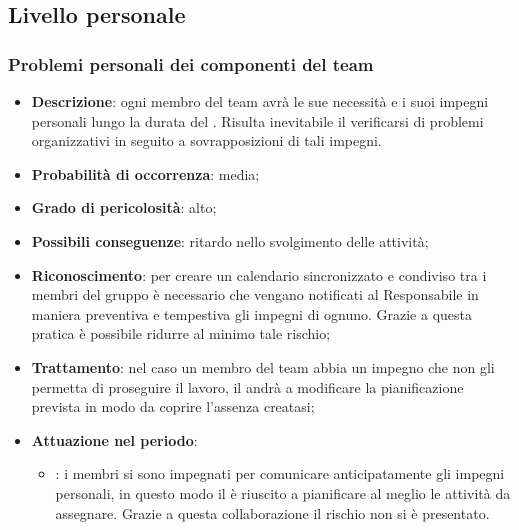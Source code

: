 \documentclass[PianoDiProgetto.tex]{subfiles}
\begin{document}
	\subsection{Livello personale}
		\subsubsection{Problemi personali dei componenti del team}
			\label{sec:ppdct}
\begin{itemize}
		\item \textbf{Descrizione}: ogni membro del team avrà le sue necessità e i suoi impegni personali lungo la durata del . Risulta inevitabile il verificarsi di problemi organizzativi in seguito a sovrapposizioni di tali impegni.
		\item \textbf{Probabilità di occorrenza}: media;
		\item \textbf{Grado di pericolosità}: alto;
		\item \textbf{Possibili conseguenze}: ritardo nello svolgimento delle attività;
		\item \textbf{Riconoscimento}: per creare un calendario sincronizzato e condiviso tra i membri del gruppo è necessario che vengano notificati al Responsabile in maniera preventiva e tempestiva gli impegni di ognuno. Grazie a questa pratica è possibile ridurre al minimo tale rischio;
		\item \textbf{Trattamento}: nel caso un membro del team abbia un impegno che non gli permetta di proseguire il lavoro, il \RESP{} andrà a modificare la pianificazione prevista in modo da coprire l'assenza creatasi;
		\item \textbf{Attuazione nel periodo}: 
			\begin{itemize}
				\item \PerAR : i membri si sono impegnati per comunicare anticipatamente gli impegni personali, in questo modo il \RESP{} è riuscito a pianificare al meglio le attività da assegnare. Grazie a questa collaborazione il rischio non si è presentato.
			\end{itemize}
	\end{itemize}
\end{document}
